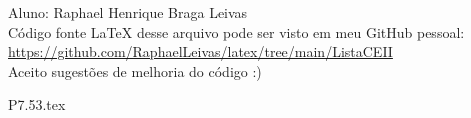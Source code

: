 \documentclass[12pt]{scrartcl}
\begin{document}
Aluno: Raphael Henrique Braga Leivas \\[20pt]
Código fonte LaTeX desse arquivo pode ser visto em meu GitHub pessoal: \\[10pt]
\href{https://github.com/RaphaelLeivas/latex/tree/main/ListaCEII}{https://github.com/RaphaelLeivas/latex/tree/main/ListaCEII} \\[20pt]
Aceito sugestões de melhoria do código :) 

{P7.53.tex}


\end{document}
